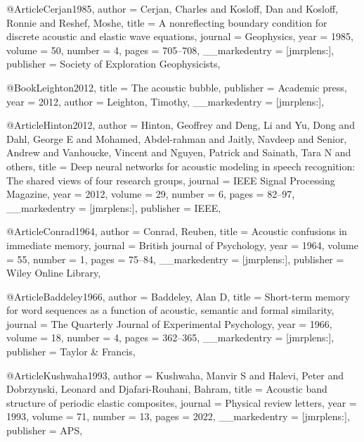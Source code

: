 {{{@Article{Cerjan1985,
  author        = {Cerjan, Charles and Kosloff, Dan and Kosloff, Ronnie and Reshef, Moshe},
  title         = {A nonreflecting boundary condition for discrete acoustic and elastic wave equations},
  journal       = {Geophysics},
  year          = {1985},
  volume        = {50},
  number        = {4},
  pages         = {705--708},
  __markedentry = {[jmrplens:]},
  publisher     = {Society of Exploration Geophysicists},
}

@Book{Leighton2012,
  title         = {The acoustic bubble},
  publisher     = {Academic press},
  year          = {2012},
  author        = {Leighton, Timothy},
  __markedentry = {[jmrplens:]},
}

@Article{Hinton2012,
  author        = {Hinton, Geoffrey and Deng, Li and Yu, Dong and Dahl, George E and Mohamed, Abdel-rahman and Jaitly, Navdeep and Senior, Andrew and Vanhoucke, Vincent and Nguyen, Patrick and Sainath, Tara N and others},
  title         = {Deep neural networks for acoustic modeling in speech recognition: The shared views of four research groups},
  journal       = {IEEE Signal Processing Magazine},
  year          = {2012},
  volume        = {29},
  number        = {6},
  pages         = {82--97},
  __markedentry = {[jmrplens:]},
  publisher     = {IEEE},
}

@Article{Conrad1964,
  author        = {Conrad, Reuben},
  title         = {Acoustic confusions in immediate memory},
  journal       = {British journal of Psychology},
  year          = {1964},
  volume        = {55},
  number        = {1},
  pages         = {75--84},
  __markedentry = {[jmrplens:]},
  publisher     = {Wiley Online Library},
}

@Article{Baddeley1966,
  author        = {Baddeley, Alan D},
  title         = {Short-term memory for word sequences as a function of acoustic, semantic and formal similarity},
  journal       = {The Quarterly Journal of Experimental Psychology},
  year          = {1966},
  volume        = {18},
  number        = {4},
  pages         = {362--365},
  __markedentry = {[jmrplens:]},
  publisher     = {Taylor \& Francis},
}

@Article{Kushwaha1993,
  author        = {Kushwaha, Manvir S and Halevi, Peter and Dobrzynski, Leonard and Djafari-Rouhani, Bahram},
  title         = {Acoustic band structure of periodic elastic composites},
  journal       = {Physical review letters},
  year          = {1993},
  volume        = {71},
  number        = {13},
  pages         = {2022},
  __markedentry = {[jmrplens:]},
  publisher     = {APS},
}

}}}
